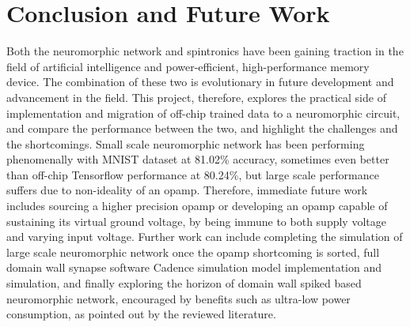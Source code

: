 \section{Conclusion and Future Work}
Both the neuromorphic network and spintronics have been gaining traction in the field of artificial intelligence and power-efficient, high-performance memory device. The combination of these two is evolutionary in future development and advancement in the field. This project, therefore, explores the practical side of implementation and migration of off-chip trained data to a neuromorphic circuit, and compare the performance between the two, and highlight the challenges and the shortcomings. Small scale neuromorphic network has been performing phenomenally with MNIST dataset at 81.02\% accuracy, sometimes even better than off-chip Tensorflow performance at 80.24\%, but large scale performance suffers due to non-ideality of an opamp. Therefore, immediate future work includes sourcing a higher precision opamp or developing an opamp capable of sustaining its virtual ground voltage, by being immune to both supply voltage and varying input voltage. Further work can include completing the simulation of large scale neuromorphic network once the opamp shortcoming is sorted, full domain wall synapse software Cadence simulation model implementation and simulation, and finally exploring the horizon of domain wall spiked based neuromorphic network, encouraged by benefits such as ultra-low power consumption, as pointed out by the reviewed literature.